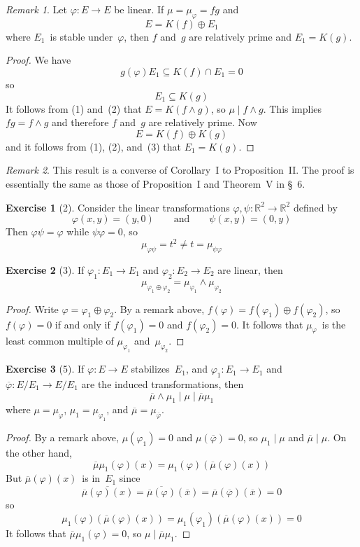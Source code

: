 \documentclass[letterpaper,12pt]{article}
\newcommand{\R}{\mathbb{R}}
\newcommand{\divides}{\mid}
\newcommand{\sect}{\cap}
\newcommand{\meet}{\wedge}
\newcommand{\dsum}{\oplus}
\newcommand{\proj}[1]{\overline{#1}}
\theoremstyle{definition}
\newtheorem*{exer}{Exercise}
\theoremstyle{remark}
\newtheorem*{rmk}{Remark}
\begin{document}
\begin{rmk}
Let \(\varphi:E\to E\) be linear. If \(\mu=\mu_{\varphi}=fg\) and
\[E=K(f)\dsum E_1\tag{1}\]
where \(E_1\)~is stable under~\(\varphi\), then \(f\) and~\(g\) are relatively prime and \(E_1=K(g)\).
\end{rmk}
\begin{proof}
We have
\[g(\varphi)E_1\subseteq K(f)\sect E_1=0\]
so
\[E_1\subseteq K(g)\tag{2}\]
It follows from (1) and~(2) that \(E=K(f\meet g)\), so \(\mu\divides f\meet g\). This implies \(fg=f\meet g\) and therefore \(f\) and~\(g\) are relatively prime. Now
\[E=K(f)\dsum K(g)\tag{3}\]
and it follows from (1), (2), and~(3) that \(E_1=K(g)\).
\end{proof}
\begin{rmk}
This result is a converse of Corollary~I to Proposition~II. The proof is essentially the same as those of Proposition~I and Theorem~V in \S~6.
\end{rmk}

\begin{exer}[2] Consider the linear transformations \(\varphi,\psi:\R^2\to\R^2\) defined by
\[\varphi(x,y)=(y,0)\qquad\text{and}\qquad\psi(x,y)=(0,y)\]
Then \(\varphi\psi=\varphi\) while \(\psi\varphi=0\), so
\[\mu_{\varphi\psi}=t^2\ne t=\mu_{\psi\varphi}\]
\end{exer}

\begin{exer}[3]
If \(\varphi_1:E_1\to E_1\) and \(\varphi_2:E_2\to E_2\) are linear, then
\[\mu_{\varphi_1\dsum\varphi_2}=\mu_{\varphi_1}\meet\mu_{\varphi_2}\]
\end{exer}
\begin{proof}
Write \(\varphi=\varphi_1\dsum\varphi_2\). By a remark above, \(f(\varphi)=f(\varphi_1)\dsum f(\varphi_2)\), so \(f(\varphi)=0\) if and only if \(f(\varphi_1)=0\) and \(f(\varphi_2)=0\). It follows that \(\mu_{\varphi}\)~is the least common multiple of \(\mu_{\varphi_1}\) and~\(\mu_{\varphi_2}\).
\end{proof}

\begin{exer}[5]
If \(\varphi:E\to E\) stabilizes~\(E_1\), and \(\varphi_1:E_1\to E_1\) and \(\proj{\varphi}:E/E_1\to E/E_1\) are the induced transformations, then
\[\proj{\mu}\meet\mu_1\divides\mu\divides\proj{\mu}\mu_1\]
where \(\mu=\mu_{\varphi}\), \(\mu_1=\mu_{\varphi_1}\), and \(\proj{\mu}=\mu_{\proj{\varphi}}\).
\end{exer}
\begin{proof}
By a remark above, \(\mu(\varphi_1)=0\) and \(\mu(\proj{\varphi})=0\), so \(\mu_1\divides\mu\) and \(\proj{\mu}\divides\mu\). On the other hand,
\[\proj{\mu}\mu_1(\varphi)(x)=\mu_1(\varphi)(\proj{\mu}(\varphi)(x))\]
But \(\proj{\mu}(\varphi)(x)\)~is in~\(E_1\) since
\[\proj{\proj{\mu}(\varphi)(x)}=\proj{\proj{\mu}(\varphi)}(\proj{x})=\proj{\mu}(\proj{\varphi})(\proj{x})=0\]
so
\[\mu_1(\varphi)(\proj{\mu}(\varphi)(x))=\mu_1(\varphi_1)(\proj{\mu}(\varphi)(x))=0\]
It follows that \(\proj{\mu}\mu_1(\varphi)=0\), so \(\mu\divides\proj{\mu}\mu_1\).
\end{proof}
\end{document}
